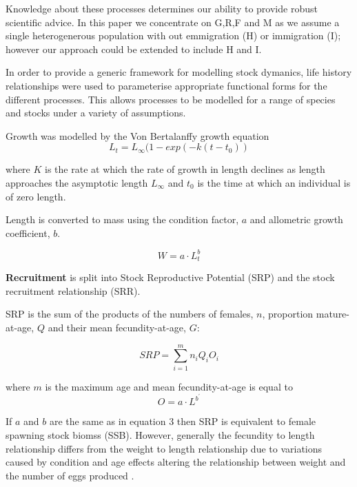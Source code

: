 \documentclass{pnastwo}
\begin{document}
\begin{article}
\begin{materials}
Knowledge about these processes determines our ability to provide robust scientific advice. 
In this paper we concentrate  on G,R,F and M as we assume a single heterogenerous population 
with out emmigration (H) or immigration (I); however our approach could be extended to include 
H and I.

In order to provide a generic framework for modelling stock dymanics, life history relationships 
were used to parameterise appropriate functional forms for the different processes. This allows 
processes to be modelled for a range of species and stocks under a variety of assumptions.

 Growth was modelled by the Von Bertalanffy growth equation \cite{von1957quantitative}
      \begin{equation} L_t = L_{\infty}(1 - exp(-k(t-t_0)) \end{equation}
         
where $K$ is the rate at which the rate of growth in length declines as length approaches the asymptotic length $L_{\infty}$ 
and $t_{0}$ is the time at which an individual is of zero length. 

Length is converted to mass using the condition factor, $a$ and allometric growth coefficient, $b$.

\begin{equation} W = a \cdot L_t^b \end{equation}


\textbf{Recruitment} is split into Stock Reproductive Potential (SRP) and the stock recruitment relationship (SRR).

SRP is the sum of the products of the numbers of females, $n$, proportion mature-at-age, $Q$ and their mean fecundity-at-age, $G$:

   \begin{equation} SRP = \sum_{i=1}^m {n_iQ_iO_i } \end{equation}

where $m$ is the maximum age and mean fecundity-at-age is equal to 
\begin{equation} O	 = a \cdot L^{b^{\prime}} \end{equation}

If $a$ and $b$ are the same as in equation 3 then SRP is equivalent to female spawning stock biomss (SSB). However, generally the
fecundity to length relationship differs from the weight to length relationship due to variations caused by condition and age 
effects altering the relationship between weight and the number of eggs produced \cite{perez2012study}.


\end{materials}
\end{article}
\end{document}

